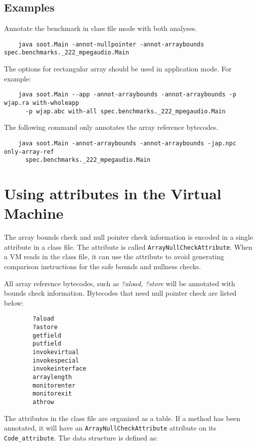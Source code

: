 \documentclass{article}
\begin{document}
\subsection{Examples}

Annotate the benchmark in class file mode with both analyses.
\begin{verbatim}
    java soot.Main -annot-nullpointer -annot-arraybounds spec.benchmarks._222_mpegaudio.Main
\end{verbatim}

The options for rectangular array should be used in application 
mode. For example:
\begin{verbatim}
    java soot.Main --app -annot-arraybounds -annot-arraybounds -p wjap.ra with-wholeapp 
      -p wjap.abc with-all spec.benchmarks._222_mpegaudio.Main
\end{verbatim}

The following command only annotates the array reference bytecodes.
\begin{verbatim}
    java soot.Main -annot-arraybounds -annot-arraybounds -jap.npc only-array-ref 
      spec.benchmarks._222_mpegaudio.Main
\end{verbatim}


\section{Using attributes in the Virtual Machine}
The array bounds check and null pointer check information is encoded 
in a single attribute in a class file. The attribute is called 
{\tt ArrayNullCheckAttribute}. When a VM reads in the class file, 
it can use the attribute to avoid generating comparison instructions for
the safe bounds and nullness checks. 

All array reference bytecodes, such as {\em ?aload, ?store} will be annotated 
with bounds check information. Bytecodes that need null pointer check 
are listed below:
\begin{verbatim}
        ?aload
        ?astore
        getfield
        putfield
        invokevirtual
        invokespecial
        invokeinterface
        arraylength
        monitorenter
        monitorexit
        athrow
\end{verbatim}

The attributes in the class file are organized as a table. If a method
has been annotated, it will have an {\tt ArrayNullCheckAttribute}
attribute on its {\tt Code\_attribute}. The data structure is defined as:
\end{document}
